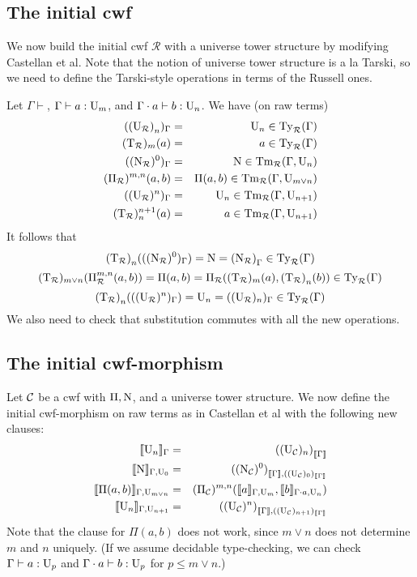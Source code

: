 \documentclass{lmcs}
\newcommand{\Ta}{\mathrm{T}}
\newcommand{\Ru}{\mathcal{R}}
\newcommand{\Un}{\U_n}
\newcommand{\TRu}{\Ta_\Ru}
\newcommand{\URu}{\U_\Ru}
\newcommand{\NRu}{\N_\Ru}
\newcommand{\PiRu}{\Pi_\Ru}
\newcommand{\TRun}{{(\Ta_\Ru)}_n}
\newcommand{\URun}{{(\U_\Ru)}_n}
\newcommand{\UC}{\U_\C}
\newcommand{\NC}{\N_\C}
\newcommand{\PiC}{\Pi_\C}
\begin{document}
\subsection{The initial cwf}

We now build the initial cwf $\Ru$ with a universe tower structure by modifying Castellan et al. Note that the notion of universe tower structure is a la Tarski, so we need to define the Tarski-style operations in terms of the Russell ones.

Let $\Gamma \vdash$, $\Gamma \vdash a : \mathrm{U}_m$, and $\Gamma \cdot a \vdash b : \Un$. We have (on raw terms)
\begin{eqnarray*}
({\URun})_\Gamma &=& \Un  \in \Ty_\Ru(\Gamma)\\
(\TRu)_m(a) &=& a \in \Ty_\Ru(\Gamma)\\
({(\NRu)^0})_\Gamma &=& \N \in \Tm_\Ru(\Gamma,\Un)\\
(\PiRu)^{m,n}(a,b) &=& \Pi(a,b) \in \Tm_\Ru(\Gamma,\U_{m \vee n})\\
(({\URu})^n)_\Gamma &=& \Un  \in \Tm_\Ru(\Gamma,\U_{n+1})\\
(\TRu)_n^{n+1}(a) &=& a \in \Tm_\Ru(\Gamma,\U_{n+1})
\end{eqnarray*}
It follows that 
$$
\TRun(((\NRu)^0)_\Gamma)  =  \N = {(\NRu)}_\Gamma \in \Ty_\Ru(\Gamma)
$$
$$
(\TRu)_{m \vee n}(\PiRu^{m,n}(a,b)) = \Pi(a,b) = \PiRu((\TRu)_m(a),\TRun(b))\in \Ty_\Ru(\Gamma)
$$
$$
\TRun(((\URu)^n)_\Gamma)  =  \Un = ({(\URu)_n})_\Gamma \in \Ty_\Ru(\Gamma)
$$
We also need to check that substitution commutes with all the new operations.

\subsection{The initial cwf-morphism}

Let ${\mathcal C}$ be a cwf with $\Pi, \mathrm{N}$, and a universe tower structure. We now define the initial cwf-morphism on raw terms as in Castellan et al with the following new clauses:
\begin{eqnarray*}
\inte{\Un}_\Gamma &=& {({({\UC})_n})}_{\inte{\Gamma}}\\
\inte{\N}_{\Gamma,\U_0} &=&  {({({\NC})^0})}_{\inte{\Gamma},((\UC)_0)_{\inte{\Gamma}}}\\
\inte{\Pi(a,b)}_{\Gamma,\U_{m \vee n}}&=& {{({\PiC})^{m,n}}}(\inte{a}_{\Gamma,\U_m},\inte{b}_{\Gamma \cdot a,\Un})\\
\inte{\U_n}_{\Gamma,\U_{n+1}} &=& {({({\UC})^n})}_{\inte{\Gamma},((\UC)_{n+1})_{\inte{\Gamma}}}
\end{eqnarray*}
Note that the clause for $\Pi(a,b)$ does not work, since $m \vee n$ does not determine $m$ and $n$ uniquely. (If we assume decidable type-checking, we can check $\Gamma \vdash a : \mathrm{U}_p$ and $\Gamma \cdot a \vdash b : \mathrm{U}_p$ for $p \leq m \vee n$.)
\end{document}
